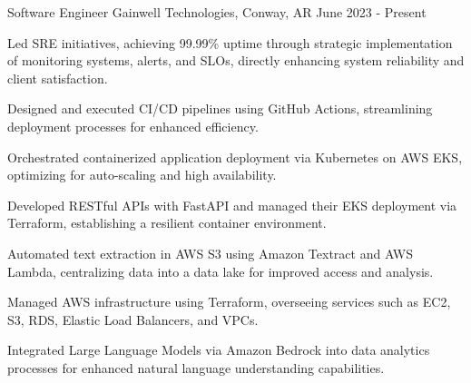 


\begin{cventries}


\cventry
{Software Engineer} %
{Gainwell Technologies, Conway, AR} %
{} %
{June 2023 - Present} %
{ %
\begin{cvitems}
\item {Led SRE initiatives, achieving 99.99\% uptime through strategic implementation of monitoring systems, alerts, and SLOs, directly enhancing system reliability and client satisfaction.}
\item {Designed and executed CI/CD pipelines using GitHub Actions, streamlining deployment processes for enhanced efficiency.}
\item {Orchestrated containerized application deployment via Kubernetes on AWS EKS, optimizing for auto-scaling and high availability.}
\item {Developed RESTful APIs with FastAPI and managed their EKS deployment via Terraform, establishing a resilient container environment.}
\item {Automated text extraction in AWS S3 using Amazon Textract and AWS Lambda, centralizing data into a data lake for improved access and analysis.}
\item {Managed AWS infrastructure using Terraform, overseeing services such as EC2, S3, RDS, Elastic Load Balancers, and VPCs.}
\item {Integrated Large Language Models via Amazon Bedrock into data analytics processes for enhanced natural language understanding capabilities.}
\end{cvitems}
}



\end{cventries}
